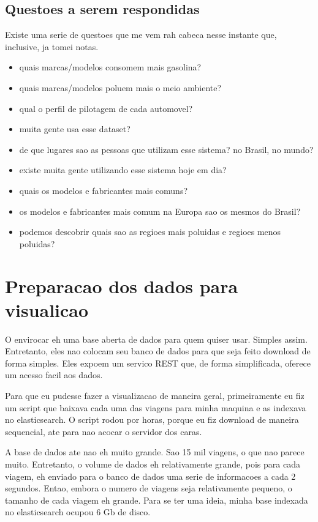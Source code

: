 \documentclass[10pt, conference]{IEEEtran}
\begin{document}
\subsection{Questoes a serem respondidas}
Existe uma serie de questoes que me vem rah cabeca nesse instante que,
inclusive, ja tomei notas.

\begin{itemize}
  \item quais marcas/modelos consomem mais gasolina?
  \item quais marcas/modelos poluem mais o meio ambiente?
  \item qual o perfil de pilotagem de cada automovel?
  \item muita gente usa esse dataset?
  \item de que lugares sao as pessoas que utilizam esse sistema? no Brasil, no mundo?
  \item existe muita gente utilizando esse sistema hoje em dia?
  \item quais os modelos e fabricantes mais comuns?
  \item os modelos e fabricantes mais comum na Europa sao os mesmos do Brasil?
  \item podemos descobrir quais sao as regioes mais poluidas e regioes menos poluidas?
\end{itemize}




\section{Preparacao dos dados para visualicao}

O envirocar eh uma base aberta de dados para quem quiser usar. Simples assim. Entretanto,
eles nao colocam seu banco de dados para que seja feito download de forma simples. Eles 
expoem um servico REST que, de forma simplificada, oferece um acesso facil aos dados.

Para que eu pudesse fazer a visualizacao de maneira geral, primeiramente eu fiz um script
que baixava cada uma das viagens para minha maquina e as indexava no elasticsearch. O script
rodou por horas, porque eu fiz download de maneira sequencial, ate para nao acocar o servidor
dos caras.

A base de dados ate nao eh muito grande. Sao 15 mil viagens, o que nao parece muito. Entretanto,
o volume de dados eh relativamente grande, pois para cada viagem, eh enviado para o banco de dados
uma serie de informacoes a cada 2 segundos. Entao, embora o numero de viagens seja relativamente 
pequeno, o tamanho de cada viagem eh grande. Para se ter uma ideia, minha base indexada no elasticsearch 
ocupou 6 Gb de disco.
\end{document}
